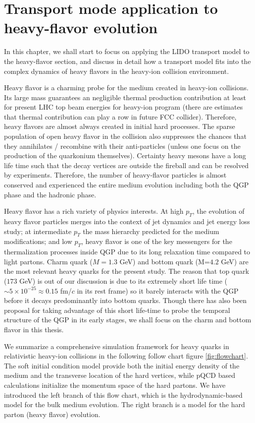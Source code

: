 \chapter{Transport mode application to heavy-flavor evolution}
In this chapter, we shall start to focus on applying the LIDO transport model to the heavy-flavor section, and discuss in detail how a transport model fits into the complex dynamics of heavy flavors in the heavy-ion collision environment.

Heavy flavor is a charming probe for the medium created in heavy-ion collisions. 
Its large mass guarantees an negligible thermal production contribution at least for present LHC top beam energies for heavy-ion program (there are estimates that thermal contribution can play a row in future FCC collider).
Therefore, heavy flavors are almost always created in initial hard processes. 
The sparse population of open heavy flavor in the collision also suppresses the chances that they annihilates / recombine with their anti-particles (unless one focus on the production of the quarkonium themselves).
Certainty heavy mesons have a long life time such that the decay vertices are outside the fireball and can be resolved by experiments.
Therefore, the number of heavy-flavor particles is almost conserved and experienced the entire medium evolution including both the QGP phase and the hadronic phase.

Heavy flavor has a rich variety of physics interests. 
At high $p_T$, the evolution of heavy flavor particles merges into the context of jet dynamics and jet energy loss study; at intermediate $p_T$ the mass hierarchy predicted for the medium modifications;
and low $p_T$, heavy flavor is one of the key messengers for the thermalization processes inside QGP due to its long relaxation time compared to light partons.
Charm quark ($M=1.3$ GeV) and bottom quark (M=$4.2$ GeV) are the most relevant heavy quarks for the present study.
The reason that top quark ($173$ GeV) is out of our discussion is due to its extremely short life time ($\sim 5\times 10^{-25} \approx 0.15$  fm/$c$ in its rest frame) so it barely interacts with the QGP before it decays predominantly into bottom quarks.
Though there has also been proposal for taking advantage of this short life-time to probe the temporal structure of the QGP in its early stages, we shall focus on the charm and bottom flavor in this thesis.

We summarize a comprehensive simulation framework for heavy quarks in relativistic heavy-ion collisions in the following follow chart figure \ref{fig:flowchart}.
The soft initial condition model provide both the initial energy density of the medium and the transverse location of the hard vertices, while pQCD based calculations initialize the momentum space of the hard partons.
We have introduced the left branch of this flow chart, which is the hydrodynamic-based model for the bulk medium evolution.
The right branch is a model for the hard parton (heavy flavor) evolution.

